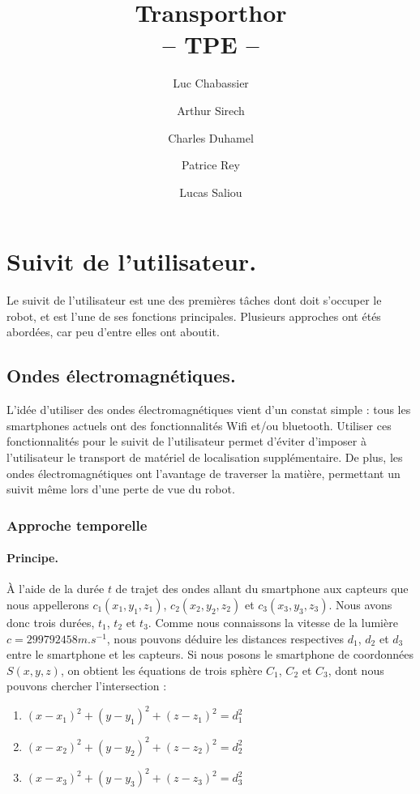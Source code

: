 \documentclass{article}
\title{Transporthor\\-- TPE --}
\author{Luc Chabassier \and Arthur Sirech \and Charles Duhamel \and Patrice Rey \and Lucas Saliou}
\begin{document}
\maketitle
\tableofcontents

\section{Suivit de l'utilisateur.}
Le suivit de l'utilisateur est une des premières tâches dont doit s'occuper le robot, et est l'une de ses fonctions principales. Plusieurs approches ont étés abordées, car peu d'entre elles ont aboutit.

\subsection{Ondes électromagnétiques.}
L'idée d'utiliser des ondes électromagnétiques vient d'un constat simple : tous les smartphones actuels ont des fonctionnalités Wifi et/ou bluetooth. Utiliser ces fonctionnalités pour le suivit de l'utilisateur permet d'éviter d'imposer à l'utilisateur le transport de matériel de localisation supplémentaire. De plus, les ondes électromagnétiques ont l'avantage de traverser la matière, permettant un suivit même lors d'une perte de vue du robot.

\subsubsection{Approche temporelle}
\paragraph{Principe.}
À l'aide de la durée $t$ de trajet des ondes allant du smartphone aux capteurs que nous appellerons $c_1(x_1,y_1,z_1)$, $c_2(x_2,y_2,z_2)$ et $c_3(x_3,y_3,z_3)$. Nous avons donc trois durées, $t_1$, $t_2$ et $t_3$. Comme nous connaissons la vitesse de la lumière $c=299792458m.s^{-1}$, nous pouvons déduire les distances respectives $d_1$, $d_2$ et $d_3$ entre le smartphone et les capteurs. Si nous posons le smartphone de coordonnées $S(x,y,z)$, on obtient les équations de trois sphère $C_1$, $C_2$ et $C_3$, dont nous pouvons chercher l'intersection :
\begin{enumerate}
    \item $(x-x_1)^2 + (y-y_1)^2 + (z-z_1)^2 = d_1^2$
    \item $(x-x_2)^2 + (y-y_2)^2 + (z-z_2)^2 = d_2^2$
    \item $(x-x_3)^2 + (y-y_3)^2 + (z-z_3)^2 = d_3^2$
\end{enumerate}
\end{document}
